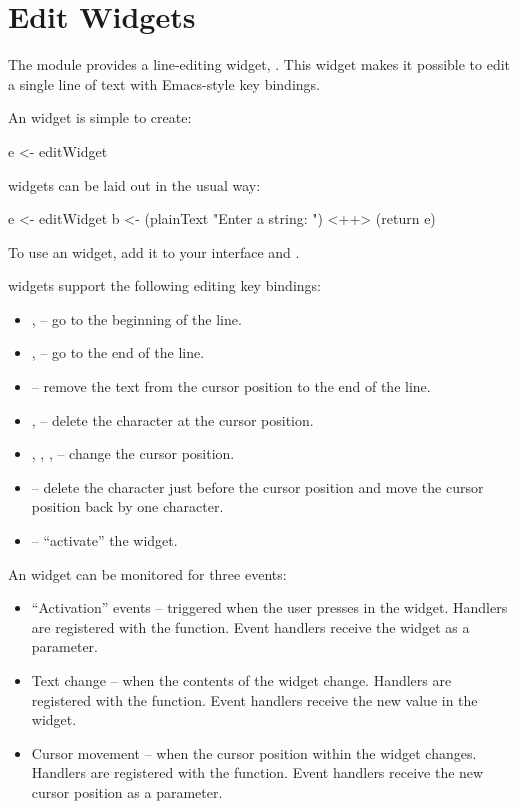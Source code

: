 \section{Edit Widgets}
\label{sec:edit}

The  module provides a line-editing widget, .
This widget makes it possible to edit a single line of text with
Emacs-style key bindings.

An  widget is simple to create:

\begin{haskellcode}
 e <- editWidget
\end{haskellcode}

 widgets can be laid out in the usual way:

\begin{haskellcode}
 e <- editWidget
 b <- (plainText "Enter a string: ") <++> (return e)
\end{haskellcode}

To use an  widget, add it to your interface and
.

 widgets support the following editing key bindings:

\begin{itemize}
\item {},  -- go to the beginning of the line.
\item {},  -- go to the end of the line.
\item {} -- remove the text from the cursor position to the
  end of the line.
\item {},  -- delete the character at the cursor
  position.
\item {}, , ,  -- change the cursor
  position.
\item {} -- delete the character just before the cursor
  position and move the cursor position back by one character.
\item {} -- ``activate'' the  widget.
\end{itemize}

An  widget can be monitored for three events:

\begin{itemize}
\item ``Activation'' events -- triggered when the user presses
   in the  widget.  Handlers are registered with
  the  function.  Event handlers receive the 
  widget as a parameter.
\item Text change -- when the contents of the  widget change.
  Handlers are registered with the  function.  Event
  handlers receive the new  value in the  widget.
\item Cursor movement -- when the cursor position within the 
  widget changes.  Handlers are registered with the 
  function.  Event handlers receive the new cursor position as a
  parameter.
\end{itemize}

